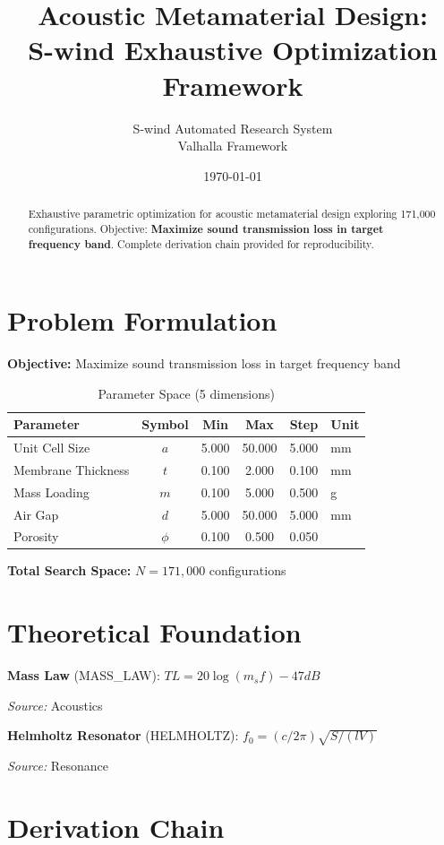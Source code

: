 \documentclass[11pt,twocolumn]{article}
\title{Acoustic Metamaterial Design: \\S-wind Exhaustive Optimization Framework}
\author{S-wind Automated Research System\\Valhalla Framework}
\date{\today}
\begin{document}
\maketitle

\begin{abstract}
Exhaustive parametric optimization for acoustic metamaterial design exploring 171,000 configurations.
Objective: \textbf{Maximize sound transmission loss in target frequency band}.
Complete derivation chain provided for reproducibility.
\end{abstract}

\section{Problem Formulation}
\textbf{Objective:} Maximize sound transmission loss in target frequency band

\begin{table}[h]
\centering
\caption{Parameter Space (5 dimensions)}
\begin{tabular}{@{}lccccl@{}}
\toprule
Parameter & Symbol & Min & Max & Step & Unit \\
\midrule
Unit Cell Size & $a$ & 5.000 & 50.000 & 5.000 & mm \\
Membrane Thickness & $t$ & 0.100 & 2.000 & 0.100 & mm \\
Mass Loading & $m$ & 0.100 & 5.000 & 0.500 & g \\
Air Gap & $d$ & 5.000 & 50.000 & 5.000 & mm \\
Porosity & $\phi$ & 0.100 & 0.500 & 0.050 &  \\
\bottomrule
\end{tabular}
\end{table}

\textbf{Total Search Space:} $N = 171,000$ configurations

\section{Theoretical Foundation}
\textbf{Mass Law} (MASS_LAW): $TL = 20\log(m_s f) - 47 dB$

\textit{Source:} Acoustics

\textbf{Helmholtz Resonator} (HELMHOLTZ): $f_0 = (c/2\pi)\sqrt{S/(lV)}$

\textit{Source:} Resonance


\section{Derivation Chain}
\end{document}

